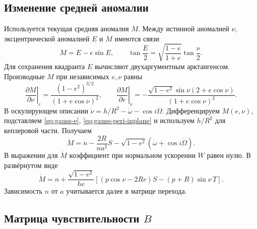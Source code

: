 \documentclass[a4paper,11pt]{article}
\numberwithin{equation}{section}
\theoremstyle{remark}
\begin{document}
\subsection{Изменение средней аномалии}

Используется текущая средняя аномалия $M$.
Между истинной аномалией $\nu$,
эксцентрической аномалией $E$ и $M$ имеются связи
\begin{equation}
 M=E-e\sin E,\qquad
 \tan\frac E2=\sqrt{\frac{1-e}{1+e}}\tan\frac\nu2.
 \label{eq:anomalies}
\end{equation}
Для сохранения квадранта $E$ вычисляют двухаргументным арктангенсом.
Производные $M$ при независимых $e,\nu$ равны
\begin{equation}
 \left.\frac{\partial M}{\partial\nu}\right|_e
 =\frac{(1-e^2)^{3/2}}{(1+e\cos\nu)^2},\qquad
 \left.\frac{\partial M}{\partial e}\right|_\nu
 =-\frac{\sqrt{1-e^2}\sin\nu(2+e\cos\nu)}
              {(1+e\cos\nu)^2}.
 \label{eq:M-derivatives}
\end{equation}
В оскулирующем описании
$\dot\nu=h/R^2-\dot\omega-\cos i\dot\Omega$.
Дифференцируем $M(e,\nu)$, подставляем
\eqref{eq:gauss-e}, \eqref{eq:gauss-peri-inplane} и
используем $h/R^2$ для кеплеровой части. Получаем
\begin{equation}
 \dot M=n-\frac{2R}{na^2}S
       -\sqrt{1-e^2}(\dot\omega+\cos i\dot\Omega).
 \label{eq:gauss-M-compact}
\end{equation}
В выражении для $\dot M$ коэффициент при нормальном ускорении
$W$ равен нулю. В развёрнутом виде
\begin{equation}
 \dot M=n+\frac{\sqrt{1-e^2}}{he}
 \left[(p\cos\nu-2Re)S-(p+R)\sin\nu\,T\right].
 \label{eq:gauss-M}
\end{equation}
Зависимость $n$ от $a$ учитывается далее в матрице перехода.

\subsection{Матрица чувствительности \texorpdfstring{$B$}{B}}
\end{document}
